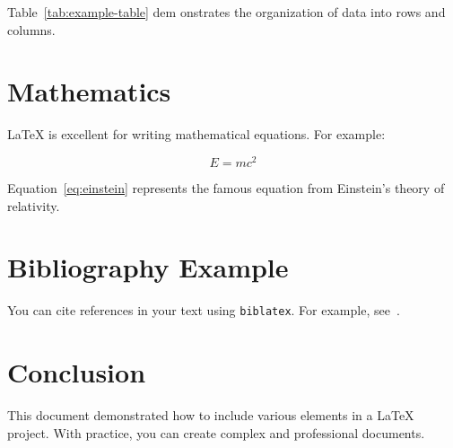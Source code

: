 \documentclass[a4paper,12pt]{article}
\begin{document}
Table~\ref{tab:example-table} dem onstrates the organization of data into rows and columns.

\section{Mathematics}
LaTeX is excellent for writing mathematical equations. For example:

\begin{equation}
    E = mc^2
    \label{eq:einstein}
\end{equation}

Equation~\ref{eq:einstein} represents the famous equation from Einstein's theory of relativity.

\section{Bibliography Example}
You can cite references in your text using \texttt{biblatex}. For example, see~\cite{knuth1984tex}.

\section{Conclusion}
This document demonstrated how to include various elements in a LaTeX project. With practice, you can create complex and professional documents.

\newpage
\printbibliography
\end{document}
